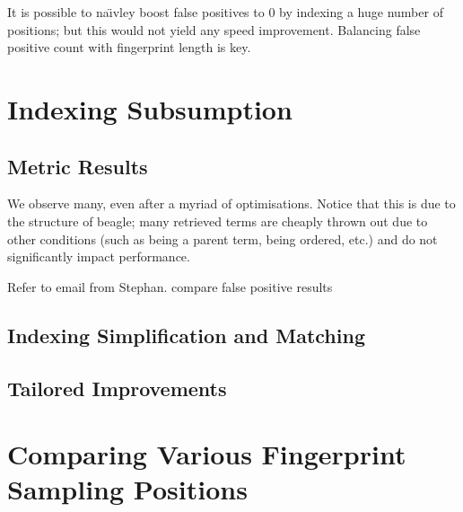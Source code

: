 It is possible to na\"{\i}vley boost false positives to 0 by indexing a
huge number of positions; but this would not yield any speed improvement. Balancing false positive count with fingerprint
length is key.

\section{Indexing Subsumption}
\label{sec:indexresults}

\subsection{Metric Results}
\label{section:instr2}

We observe many, even after a myriad of optimisations. Notice
that this is due to the structure of beagle; many retrieved terms
are cheaply thrown out due to other conditions (such as being a parent
term, being ordered, etc.) and do not significantly impact performance.

Refer to email from Stephan. compare false positive results

\subsection{Indexing Simplification and Matching}

\subsection{Tailored Improvements}
\label{sec:tailresults}


\section{Comparing Various Fingerprint Sampling Positions}



